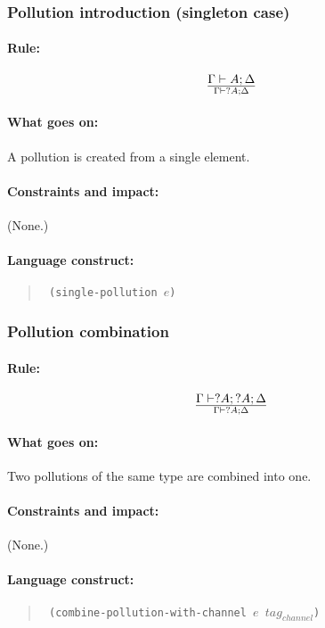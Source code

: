 \documentclass[a4paper]{article}
\begin{document}
\subsubsection{Pollution introduction (singleton case)}
\paragraph{Rule:}
$$
{
  \Gamma \vdash A;\Delta
}\over{
  \Gamma \vdash ?A;\Delta
}
$$
\paragraph{What goes on:} A pollution is created from a single element.
\paragraph{Constraints and impact:} (None.)
\paragraph{Language construct:}
\begin{quote}\tt
  (single-pollution $e$)
\end{quote}

\subsubsection{Pollution combination}
\paragraph{Rule:}
$$
{
  \Gamma \vdash ?A; ?A; \Delta
}\over{
  \Gamma \vdash ?A; \Delta
}
$$
\paragraph{What goes on:} Two pollutions of the same type are combined into one.
\paragraph{Constraints and impact:} (None.)
\paragraph{Language construct:}
\begin{quote}\tt
  (combine-pollution-with-channel $e$ $\mathit{tag}_{channel}$)
\end{quote}
\end{document}
